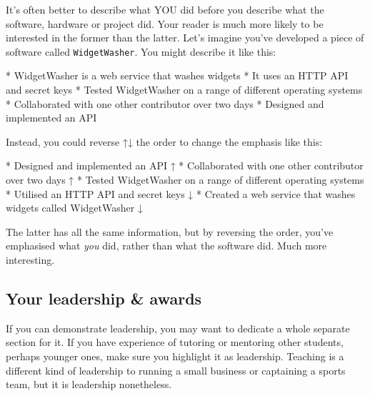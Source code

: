 \documentclass[
]{book}
\newenvironment{Shaded}{\begin{snugshade}}{\end{snugshade}}
\newcommand{\NormalTok}[1]{#1}
\newcommand{\SpecialStringTok}[1]{\textcolor[rgb]{0.31,0.60,0.02}{#1}}
\begin{document}
It's often better to describe what YOU did before you describe what the software, hardware or project did. Your reader is much more likely to be interested in the former than the latter. Let's imagine you've developed a piece of software called \texttt{WidgetWasher}. You might describe it like this:

\begin{Shaded}
\begin{Highlighting}[]
\SpecialStringTok{* }\NormalTok{WidgetWasher is a web service that washes widgets}
\SpecialStringTok{* }\NormalTok{It uses an HTTP API and secret keys}
\SpecialStringTok{* }\NormalTok{Tested WidgetWasher on a range of different operating systems}
\SpecialStringTok{* }\NormalTok{Collaborated with one other contributor over two days}
\SpecialStringTok{* }\NormalTok{Designed and implemented an API}
\end{Highlighting}
\end{Shaded}

Instead, you could reverse ↑↓ the order to change the emphasis like this:

\begin{Shaded}
\begin{Highlighting}[]
\SpecialStringTok{* }\NormalTok{Designed and implemented an API ↑}
\SpecialStringTok{* }\NormalTok{Collaborated with one other contributor over two days ↑}
\SpecialStringTok{* }\NormalTok{Tested WidgetWasher on a range of different operating systems}
\SpecialStringTok{* }\NormalTok{Utilised an HTTP API and secret keys ↓}
\SpecialStringTok{* }\NormalTok{Created a web service that washes widgets called WidgetWasher ↓}
\end{Highlighting}
\end{Shaded}

The latter has all the same information, but by reversing the order, you've emphasised what \emph{you} did, rather than what the software did. Much more interesting. 💪

\hypertarget{prizes}{%
\subsection{Your leadership \& awards}\label{prizes}}

If you can demonstrate leadership, you may want to dedicate a whole separate section for it. If you have experience of tutoring or mentoring other students, perhaps younger ones, make sure you highlight it as leadership. Teaching is a different kind of leadership to running a small business or captaining a sports team, but it is leadership nonetheless.
\end{document}
